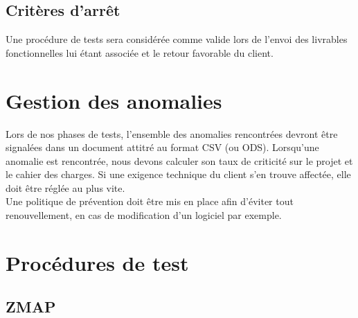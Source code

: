 \documentclass[a4paper,11pt,french]{article}
\begin{document}
\subsection{Critères d'arrêt}

Une procédure de tests sera considérée comme valide lors de l'envoi des livrables fonctionnelles lui étant associée et le retour favorable du client.


\section{Gestion des anomalies}

Lors de nos phases de tests, l'ensemble des anomalies rencontrées devront être signalées dans un document attitré au format CSV (ou ODS). Lorsqu'une anomalie est rencontrée, nous devons calculer son taux de criticité sur le projet et le cahier des charges. Si une exigence technique du client s'en trouve affectée, elle doit être réglée au plus vite.\\

Une politique de prévention doit être mis en place afin d'éviter tout renouvellement, en cas de modification d'un logiciel par exemple.



\section{Procédures de test}
\subsection{ZMAP}
\end{document}
